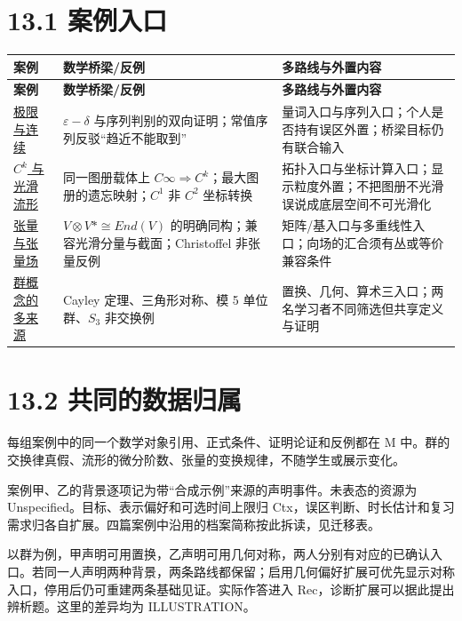 \documentclass[UTF8,a4paper,zihao=-4,fontset=windows,openany]{ctexbook}
\def\mathrm#1{#1}%
\begin{document}
\section{13.1 案例入口}
\begingroup\small\setlength{\tabcolsep}{4pt}
\begin{longtable}{>{\raggedright\arraybackslash}p{}>{\raggedright\arraybackslash}p{}>{\raggedright\arraybackslash}p{}}
\toprule
\textbf{案例} & \textbf{数学桥梁/反例} & \textbf{多路线与外置内容} \\
\midrule
\endfirsthead
\toprule
\textbf{案例} & \textbf{数学桥梁/反例} & \textbf{多路线与外置内容} \\
\midrule
\endhead
\bottomrule
\endfoot
\bottomrule
\endlastfoot
\hyperref[mcs-source-16]{极限与连续} & \(\varepsilon-\delta\) 与序列判别的双向证明；常值序列反驳“趋近不能取到” & 量词入口与序列入口；个人是否持有误区外置；桥梁目标仍有联合输入 \\
\hyperref[mcs-source-17]{\(C^{k}\) 与光滑流形} & 同一图册载体上 \(C\infty\Rightarrow C^{k}\)；最大图册的遗忘映射；\(C^{1}\) 非 \(C^{2}\) 坐标转换 & 拓扑入口与坐标计算入口；显示粒度外置；不把图册不光滑误说成底层空间不可光滑化 \\
\hyperref[mcs-source-18]{张量与张量场} & \(V\otimes V*\cong\mathrm{End}(V)\) 的明确同构；兼容光滑分量与截面；Christoffel 非张量反例 & 矩阵/基入口与多重线性入口；向场的汇合须有丛或等价兼容条件 \\
\hyperref[mcs-source-19]{群概念的多来源} & Cayley 定理、三角形对称、模 5 单位群、\(S_{3}\) 非交换例 & 置换、几何、算术三入口；两名学习者不同筛选但共享定义与证明 \\
\end{longtable}
\endgroup

\section{13.2 共同的数据归属}
每组案例中的同一个数学对象引用、正式条件、证明论证和反例都在 M 中。群的交换律真假、流形的微分阶数、张量的变换规律，不随学生或展示变化。

案例甲、乙的背景逐项记为带“合成示例”来源的声明事件。未表态的资源为 Unspecified。目标、表示偏好和可选时间上限归 Ctx，误区判断、时长估计和复习需求归各自扩展。四篇案例中沿用的档案简称按此拆读，见迁移表。

以群为例，甲声明可用置换，乙声明可用几何对称，两人分别有对应的已确认入口。若同一人声明两种背景，两条路线都保留；启用几何偏好扩展可优先显示对称入口，停用后仍可重建两条基础见证。实际作答进入 Rec，诊断扩展可以据此提出辨析题。这里的差异均为 ILLUSTRATION。
\end{document}
